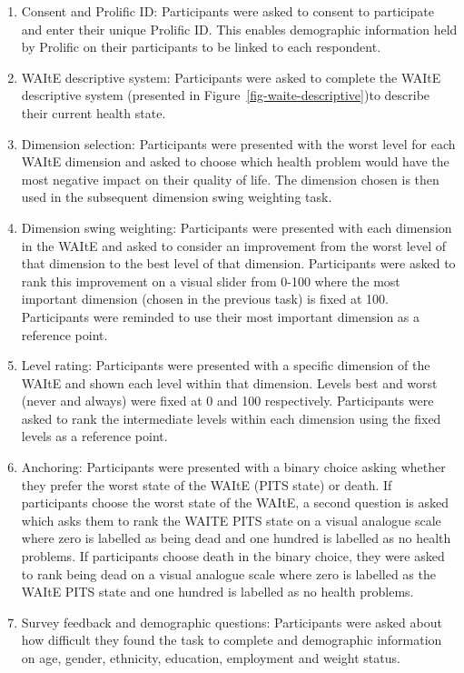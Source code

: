 \documentclass[
  number,
  preprint]{elsarticle}
\providecommand{\tightlist}{%
  \setlength{\itemsep}{0pt}\setlength{\parskip}{0pt}}\usepackage{longtable,booktabs,array}
\begin{document}
\begin{enumerate}
\def\labelenumi{\arabic{enumi}.}
\tightlist
\item
  Consent and Prolific ID: Participants were asked to consent to
  participate and enter their unique Prolific ID. This enables
  demographic information held by Prolific on their participants to be
  linked to each respondent.
\item
  WAItE descriptive system: Participants were asked to complete the
  WAItE descriptive system (presented in
  Figure~\ref{fig-waite-descriptive})to describe their current health
  state.
\item
  Dimension selection: Participants were presented with the worst level
  for each WAItE dimension and asked to choose which health problem
  would have the most negative impact on their quality of life. The
  dimension chosen is then used in the subsequent dimension swing
  weighting task.\\
\item
  Dimension swing weighting: Participants were presented with each
  dimension in the WAItE and asked to consider an improvement from the
  worst level of that dimension to the best level of that dimension.
  Participants were asked to rank this improvement on a visual slider
  from 0-100 where the most important dimension (chosen in the previous
  task) is fixed at 100. Participants were reminded to use their most
  important dimension as a reference point.\\
\item
  Level rating: Participants were presented with a specific dimension of
  the WAItE and shown each level within that dimension. Levels best and
  worst (never and always) were fixed at 0 and 100 respectively.
  Participants were asked to rank the intermediate levels within each
  dimension using the fixed levels as a reference point.
\item
  Anchoring: Participants were presented with a binary choice asking
  whether they prefer the worst state of the WAItE (PITS state) or
  death. If participants choose the worst state of the WAItE, a second
  question is asked which asks them to rank the WAITE PITS state on a
  visual analogue scale where zero is labelled as being dead and one
  hundred is labelled as no health problems. If participants choose
  death in the binary choice, they were asked to rank being dead on a
  visual analogue scale where zero is labelled as the WAItE PITS state
  and one hundred is labelled as no health problems.
\item
  Survey feedback and demographic questions: Participants were asked
  about how difficult they found the task to complete and demographic
  information on age, gender, ethnicity, education, employment and
  weight status.
\end{enumerate}
\end{document}
